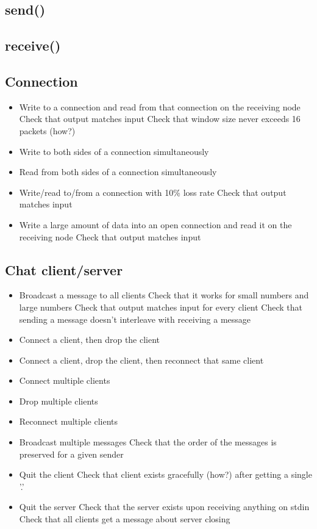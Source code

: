 \documentclass[]{article}
\begin{document}
\subsection{send()}
\subsection{receive()}
\subsection{Connection}
\begin{itemize}
	\item Write to a connection and read from that connection on the receiving node
	\subitem Check that output matches input
	\subitem Check that window size never exceeds 16 packets (how?)
	\item Write to both sides of a connection simultaneously
	\item Read from both sides of a connection simultaneously
	\item Write/read to/from a connection with 10\% loss rate
	\subitem Check that output matches input
	\item Write a large amount of data into an open connection and read it on the receiving node
	\subitem Check that output matches input
\end{itemize}
\subsection{Chat client/server}
\begin{itemize}
	\item Broadcast a message to all clients
	\subitem Check that it works for small numbers and large numbers
	\subitem Check that output matches input for every client
	\subitem Check that sending a message doesn't interleave with receiving a message
	\item Connect a client, then drop the client
	\item Connect a client, drop the client, then reconnect that same client
	\item Connect multiple clients
	\item Drop multiple clients
	\item Reconnect multiple clients
	\item Broadcast multiple messages
	\subitem Check that the order of the messages is preserved for a given sender
	\item Quit the client
	\subitem Check that client exists gracefully (how?) after getting a single '.'
	\item Quit the server
	\subitem Check that the server exists upon receiving anything on stdin
	\subitem Check that all clients get a message about server closing
	
\end{itemize}
\end{document}
